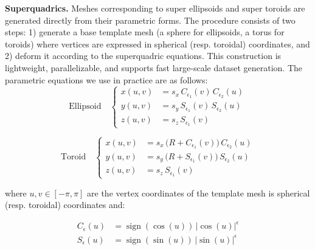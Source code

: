\textbf{Superquadrics.} Meshes corresponding to super ellipsoids and super toroids are generated directly from their parametric forms. The procedure consists of two steps: 1) generate a base template mesh (a sphere for ellipsoids, a torus for toroids) where vertices are expressed in spherical (resp. toroidal) coordinates, and 2) deform it according to the superquadric equations. This construction is lightweight, parallelizable, and supports fast large-scale dataset generation. The parametric equations we use in practice are as follows:
\begin{equation}
\text{Ellipsoid} \quad
\begin{cases}
x(u,v) &= s_x \, C_{\epsilon_1}(v) \, C_{\epsilon_2}(u) \\
y(u,v) &= s_y \, S_{\epsilon_1}(v) \, S_{\epsilon_2}(u) \\
z(u,v) &= s_z \, S_{\epsilon_1}(v)
\end{cases}
\end{equation}

\begin{equation}
\text{Toroid} \quad
\begin{cases}
x(u,v) &= s_x \, \bigl(R + C_{\epsilon_1}(v)\bigr) \, C_{\epsilon_2}(u) \\
y(u,v) &= s_y \, \bigl(R + S_{\epsilon_1}(v)\bigr) \, S_{\epsilon_2}(u) \\
z(u,v) &= s_z \, S_{\epsilon_1}(v)
\end{cases}
\end{equation}

where $u,v \in [-\pi, \pi]$ are the vertex coordinates of the template mesh is spherical (resp. toroidal) coordinates and:

\begin{equation}
\begin{aligned}
C_\epsilon(u) &= \operatorname{sign}(\cos(u)) \, |\cos(u)|^\epsilon \\
S_\epsilon(u) &= \operatorname{sign}(\sin(u)) \, |\sin(u)|^\epsilon
\end{aligned}
\end{equation}


